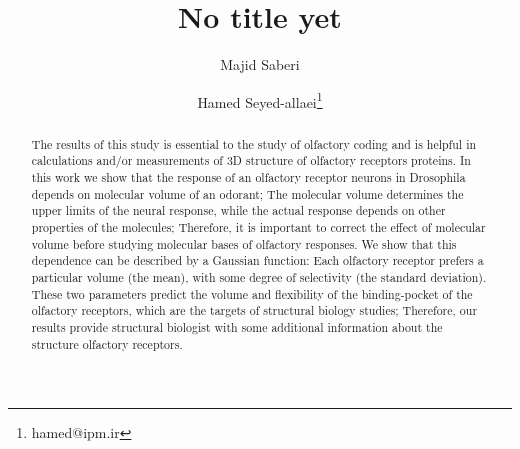 \documentclass[11pt]{paper} %
\title{No title yet}
\author{Majid Saberi \and Hamed Seyed-allaei\thanks{hamed@ipm.ir}}
\begin{document}
\maketitle

\begin{abstract}
	The results of this study is essential to the study of olfactory coding and is helpful in calculations and/or measurements of 3D  structure of olfactory receptors proteins.
	In this work we show that the response of an olfactory receptor neurons in Drosophila depends on molecular volume of an odorant;  
	The molecular volume determines the upper limits of the neural response, 
	while the actual response depends on other properties of the molecules; 
	Therefore, it is important to correct the effect of molecular volume before studying molecular bases of olfactory responses.
	We show that this dependence can be described by a Gaussian function: 
	Each olfactory receptor prefers a particular volume (the mean), 
	with some degree of selectivity (the standard deviation). 
	These two parameters predict the volume and flexibility of the binding-pocket of the olfactory receptors, 
	which are the targets of structural biology studies; 
	Therefore, our results provide structural biologist with some additional information about the structure olfactory receptors. 
\end{abstract}
\end{document}
